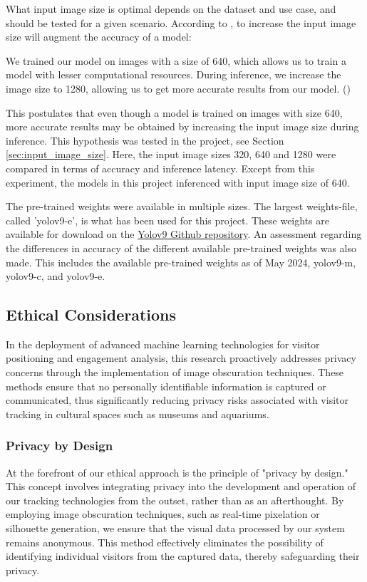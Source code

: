 What input image size is optimal depends on the dataset and use case, and should be tested for a given scenario. According to \citeauthor{ga2024roboflow_custom_dataset}, to increase the input image size will augment the accuracy of a model:

\begin{myquote}
    We trained our model on images with a size of 640, which allows us to train a model with lesser computational resources. During inference, we increase the image size to 1280, allowing us to get more accurate results from our model. (\cite{ga2024roboflow_custom_dataset})
\end{myquote}

This postulates that even though a model is trained on images with size 640, more accurate results may be obtained by increasing the input image size during inference. This hypothesis was tested in the project, see Section \ref{sec:input_image_size}. Here, the input image sizes 320, 640 and 1280 were compared in terms of accuracy and inference latency. Except from this experiment, the models in this project inferenced with input image size of 640.

The pre-trained weights were available in multiple sizes. The largest weights-file, called 'yolov9-e', is what has been used for this project. These weights are available for download on the \href{https://github.com/WongKinYiu/yolov9}{Yolov9 Github repository}. An assessment regarding the differences in accuracy of the different available pre-trained weights was also made. This includes the available pre-trained weights as of May 2024, yolov9-m, yolov9-c, and yolov9-e.

\subsection{Ethical Considerations}
In the deployment of advanced machine learning technologies for visitor positioning and engagement analysis, this research proactively addresses privacy concerns through the implementation of image obscuration techniques. These methods ensure that no personally identifiable information is captured or communicated, thus significantly reducing privacy risks associated with visitor tracking in cultural spaces such as museums and aquariums.

\subsubsection{Privacy by Design}
At the forefront of our ethical approach is the principle of "privacy by design." This concept involves integrating privacy into the development and operation of our tracking technologies from the outset, rather than as an afterthought. By employing image obscuration techniques, such as real-time pixelation or silhouette generation, we ensure that the visual data processed by our system remains anonymous. This method effectively eliminates the possibility of identifying individual visitors from the captured data, thereby safeguarding their privacy.

